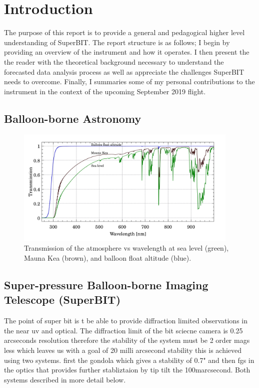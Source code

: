 \chapter{Introduction}

The purpose of this report is to provide a general and pedagogical higher level understanding of SuperBIT. The report structure is as follows; I begin by providing an overview of the instrument and how it operates. I then present the the reader with the theoretical background necessary to understand the forecasted data analysis process as well as appreciate the challenges SuperBIT needs to overcome. Finally, I summaries some of my personal contributions to the instrument in the context of the upcoming September 2019 flight.
  

\section{Balloon-borne Astronomy}

\begin{figure}
    \begin{small}
        \begin{center}
            \includegraphics[width=0.95\textwidth]{Introduction/figs/atmosphere.jpg}
        \end{center}
        \caption{Transmission of the atmosphere vs wavelength at sea level (green), Mauna Kea (brown), and balloon float altitude (blue). }
        \label{fig:atmos}
    \end{small}
\end{figure}


\section{Super-pressure Balloon-borne Imaging Telescope (SuperBIT)}
The point of super bit is t be able to provide diffraction limited observations in the near uv and optical. The diffraction limit of the bit sciecne camera is 0.25 arcseconds resolution therefore the stability of the system must be 2 order mags less which leaves us with a goal of 20 milli arcsecond stability this is achieved using two systems. first the gondola which gives a stability of 0.7" and then fgs in the optics that provides further stabliztaion by tip tilt the 100marcsecond. Both systems described in more detail below.

